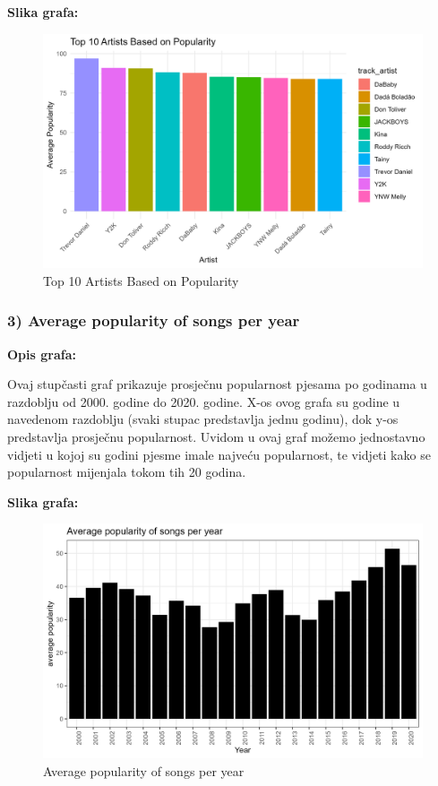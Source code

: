 	\textbf{Slika grafa:}
	\begin{figure}[H]
		\includegraphics[scale=0.9]{slike/Top 10 popularity}
		\centering
		\caption{Top 10 Artists Based on Popularity}
		
	\end{figure}


	\subsubsection{3) Average popularity of songs per year}
	
	\textbf{Opis grafa:}
	
	Ovaj stupčasti graf prikazuje prosječnu popularnost pjesama po godinama u razdoblju od 2000. godine do 2020. godine. X-os ovog grafa su godine u navedenom razdoblju (svaki stupac predstavlja jednu godinu), dok y-os predstavlja prosječnu popularnost. 
	Uvidom u ovaj graf možemo jednostavno vidjeti u kojoj su godini pjesme imale najveću popularnost, te vidjeti kako se popularnost mijenjala tokom tih 20 godina.

	
	\textbf{Slika grafa:}
	\begin{figure}[H]
		\includegraphics[scale=0.9]{slike/Average popularity of songs per year.png}
		\centering
		\caption{Average popularity of songs per year}
		
	\end{figure}
	
